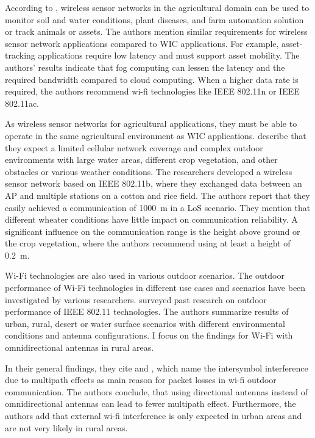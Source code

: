 According to \textcite{ahmed_internet_2018}, wireless sensor networks in the agricultural domain can be used to monitor soil and water conditions, plant diseases, and farm automation solution
or track animals or assets. The authors mention similar requirements for wireless sensor network applications compared to \ac{WIC} applications.
For example, asset-tracking applications require low latency and must support asset mobility.
The authors' results indicate that fog computing can lessen the latency and the required bandwidth compared to cloud computing.
When a higher data rate is required, the authors recommend wi-fi technologies like IEEE 802.11n or IEEE 802.11ac.

As wireless sensor networks for agricultural applications, they must be able to operate in the same agricultural environment as \ac{WIC} applications.
\textcite{brinkhoff_characterization_2017} describe that they expect a limited cellular network coverage and complex outdoor
environments with large water areas, different crop vegetation, and other obstacles or various weather conditions. The
researchers developed a wireless sensor network based on IEEE 802.11b, where they exchanged data between an \ac{AP} and multiple stations on
a cotton and rice field. The authors report that they easily achieved a communication of \SI{1000}{\metre} in a \ac{LoS} scenario.
They mention that different wheater conditions have little impact on communication reliability. A significant influence on the communication range is the height above ground or the crop vegetation, where the authors recommend using at least a height of \SI{0.2}{\metre}.


Wi-Fi technologies are also used in various outdoor scenarios.
The outdoor performance of Wi-Fi technologies in different use cases and scenarios have been investigated by various researchers.
\textcite{aust_outdoor_2015} surveyed past research on outdoor performance of IEEE 802.11 technologies. The authors summarize results of
urban, rural, desert or water surface scenarios with different environmental conditions and antenna configurations. I focus on the
findings for Wi-Fi with omnidirectional antennas in rural areas.

In their general findings, they cite \cite{sheth_packet_2007} and \cite{aguayo_link-level_2004}, which name the intersymbol
interference due to multipath effects as main reason for packet losses in wi-fi outdoor communication. The authors conclude,
that using directional antennas instead of omnidirectional antennas can lead to fewer multipath effect. Furthermore, the authors add
that external wi-fi interference is only expected in urban areas and are not very likely in rural areas.

